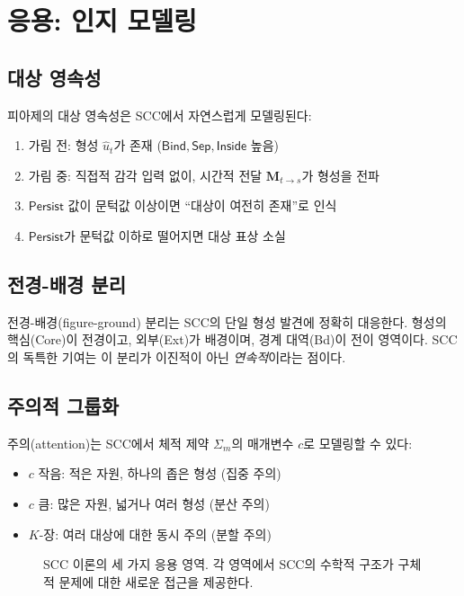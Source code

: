 \section{응용: 인지 모델링}
\label{sec:cognitive-applications}

\subsection{대상 영속성}

피아제의 대상 영속성은 SCC에서 자연스럽게 모델링된다:
\begin{enumerate}
    \item 가림 전: 형성 $\hat{u}_t$가 존재 ($\mathsf{Bind}, \mathsf{Sep}, \mathsf{Inside}$ 높음)
    \item 가림 중: 직접적 감각 입력 없이, 시간적 전달 $\mathbf{M}_{t \to s}$가 형성을 전파
    \item $\mathsf{Persist}$ 값이 문턱값 이상이면 ``대상이 여전히 존재''로 인식
    \item $\mathsf{Persist}$가 문턱값 이하로 떨어지면 대상 표상 소실
\end{enumerate}

\subsection{전경-배경 분리}

전경-배경(figure-ground) 분리는 SCC의 단일 형성 발견에 정확히 대응한다. 형성의 핵심(Core)이 전경이고, 외부(Ext)가 배경이며, 경계 대역(Bd)이 전이 영역이다. SCC의 독특한 기여는 이 분리가 이진적이 아닌 \emph{연속적}이라는 점이다.

\subsection{주의적 그룹화}

주의(attention)는 SCC에서 체적 제약 $\Sigma_m$의 매개변수 $c$로 모델링할 수 있다:
\begin{itemize}
    \item $c$ 작음: 적은 자원, 하나의 좁은 형성 (집중 주의)
    \item $c$ 큼: 많은 자원, 넓거나 여러 형성 (분산 주의)
    \item $K$-장: 여러 대상에 대한 동시 주의 (분할 주의)
\end{itemize}

\begin{figure}[t]
\centering
{}
\caption{SCC 이론의 세 가지 응용 영역. 각 영역에서 SCC의 수학적 구조가 구체적 문제에 대한 새로운 접근을 제공한다.}
\label{fig:applications}
\end{figure}


